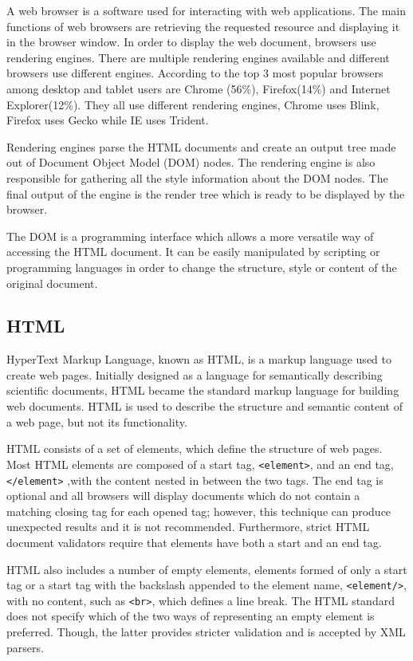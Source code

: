 \documentclass[10pt,a4paper,twoside]{book}
\begin{document}
A web browser is a software used for interacting with web applications. The main functions of web browsers are retrieving the requested resource and displaying it in the browser window. In order to display the web document, browsers use rendering engines. There are multiple rendering engines available and different browsers use different engines. According to \cite{statcounter} the top 3 most popular browsers among desktop and tablet users are Chrome (56\%), Firefox(14\%) and Internet Explorer(12\%). They all use different rendering engines, Chrome uses Blink, Firefox uses Gecko while IE uses Trident\cite{howbrowserswork}.

Rendering engines parse the HTML documents and create an output tree made out of Document Object Model (DOM) nodes. The rendering engine is also responsible for gathering all the style information about the DOM nodes. The final output of the engine is the render tree which is ready to be displayed by the browser\cite{howbrowserswork}.

The DOM is a programming interface which allows a more versatile way of accessing the HTML document. It can be easily manipulated by scripting or programming languages in order to change the structure, style or content of the original document\cite{dom}.

\subsection{HTML}
HyperText Markup Language, known as HTML, is a markup language used to create web pages. Initially designed as a language for semantically describing scientific documents, HTML became the standard markup language for building web documents. HTML is used to describe the structure and semantic content of a web page, but not its functionality\cite{world1999html}.

HTML consists of a set of elements, which define the structure of web pages. Most HTML elements are composed of a start tag, \texttt{<element>}, and an end tag, \texttt{</element>} ,with the content nested in between the two tags. The end tag is optional and all browsers will display documents which do not contain a matching closing tag for each opened tag; however, this technique can produce unexpected results and it is not recommended. Furthermore, strict HTML document validators require that elements have both a start and an end tag\cite{world1999html}.

HTML also includes a number of empty elements, elements formed of only a start tag or a start tag with the backslash appended to the element name, \texttt{<element/>}, with no content, such as \texttt{<br>}, which defines a line break. The HTML standard does not specify which of the two ways of representing an empty element is preferred. Though, the latter provides stricter validation and is accepted by XML parsers\cite{world1999html}.
\end{document}
